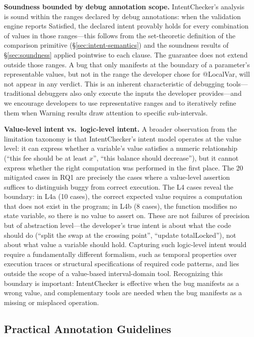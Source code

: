 \documentclass[pdflatex,sn-basic]{sn-jnl}%
\theoremstyle{thmstyleone}%
\theoremstyle{thmstyletwo}%
\theoremstyle{thmstylethree}%
\begin{document}
\smallskip
\noindent\textbf{Soundness bounded by debug annotation scope.}
IntentChecker's analysis is sound within the ranges declared by debug annotations: when the validation engine reports Satisfied, the declared intent provably holds for every combination of values in those ranges---this follows from the set-theoretic definition of the comparison primitive (§\ref{sec:intent-semantics}) and the soundness results of §\ref{sec:soundness} applied pointwise to each clause.
The guarantee does not extend outside those ranges.
A bug that only manifests at the boundary of a parameter's representable values, but not in the range the developer chose for @LocalVar, will not appear in any verdict.
This is an inherent characteristic of debugging tools---traditional debuggers also only execute the inputs the developer provides---and we encourage developers to use representative ranges and to iteratively refine them when Warning results draw attention to specific sub-intervals.

\smallskip
\noindent\textbf{Value-level intent vs.\ logic-level intent.}
A broader observation from the limitation taxonomy is that IntentChecker's intent model operates at the value level: it can express whether a variable's value satisfies a numeric relationship (``this fee should be at least $x$'', ``this balance should decrease''), but it cannot express whether the right computation was performed in the first place.
The 20 mitigated cases in RQ1 are precisely the cases where a value-level assertion suffices to distinguish buggy from correct execution.
The L4 cases reveal the boundary: in L4a (10 cases), the correct expected value requires a computation that does not exist in the program; in L4b (8 cases), the function modifies no state variable, so there is no value to assert on.
These are not failures of precision but of abstraction level---the developer's true intent is about what the code should do (``split the swap at the crossing point'', ``update totalLocked''), not about what value a variable should hold.
Capturing such logic-level intent would require a fundamentally different formalism, such as temporal properties over execution traces or structural specifications of required code patterns, and lies outside the scope of a value-based interval-domain tool.
Recognizing this boundary is important: IntentChecker is effective when the bug manifests as a wrong value, and complementary tools are needed when the bug manifests as a missing or misplaced operation.

\subsection{Practical Annotation Guidelines}\label{sec:disc:guidelines}
\end{document}
